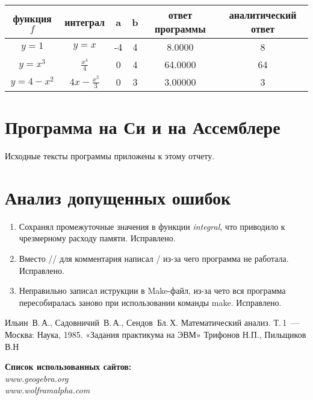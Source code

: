 \documentclass[a4paper,12pt,titlepage,finall]{article}
\begin{document}
\begin{tabular}{|c|c|c|c|c|c|}
    \hline
     функция $f$ & интеграл & a & b & ответ программы & аналитический ответ \\
     \hline
     $y = 1$& $y = x$ & -4 & 4 & 8.0000 & 8\\
     $y = x^3$ & $\frac{x^4}{4}$ & 0 & 4 & 64.0000 & 64\\
     $y = 4 - x^2$& $4x - \frac{x^3}{3}$ & 0 & 3 & 3.00000 & 3\\
     \hline
\end{tabular}

\newpage

\section{Программа на Си и на Ассемблере}


Исходные тексты программы приложены к этому отчету.


\newpage

\section{Анализ допущенных ошибок}

\begin{enumerate}
    \item Сохранял промежуточные значения в функции \textsl{integral}, что приводило к чрезмерному расходу памяти. Исправлено.\\
    \item Вместо // для комментария написал / из-за чего программа не работала. Исправлено.\\
    \item Неправильно записал иструкции в Make-файл, из-за чето вся программа пересобиралась заново при использовании команды make. Исправлено.\\
\end{enumerate}

\newpage
\begin{raggedright}
\begin{thebibliography}{99}
 Ильин~В.\,А., Садовничий~В.\,А., Сендов~Бл.\,Х. Математический анализ. Т.\,1~---
    Москва: Наука, 1985.
 «Задания практикума на ЭВМ» Трифонов Н.П., Пильщиков В.Н
\end{thebibliography}
\textbf{Список использованных сайтов:}\\
\textit{www.geogebra.org}\\
\textit{www.wolframalpha.com}\\
\end{raggedright}

\newpage
\end{document}
